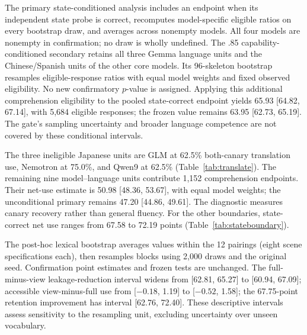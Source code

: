 The primary state-conditioned analysis includes an endpoint when its independent state probe is correct, recomputes model-specific eligible ratios on every bootstrap draw, and averages across nonempty models. All four models are nonempty in confirmation; no draw is wholly undefined. The .85 capability-conditioned secondary retains all three Gemma language units and the Chinese/Spanish units of the other core models. Its 96-skeleton bootstrap resamples eligible-response ratios with equal model weights and fixed observed eligibility. No new confirmatory $p$-value is assigned. Applying this additional comprehension eligibility to the pooled state-correct endpoint yields 65.93 [64.82, 67.14], with 5,684 eligible responses; the frozen value remains 63.95 [62.73, 65.19]. The gate's sampling uncertainty and broader language competence are not covered by these conditional intervals.

The three ineligible Japanese units are GLM at 62.5\% both-canary translation use, Nemotron at 75.0\%, and Qwen9 at 62.5\% (Table~\ref{tab:translate}). The remaining nine model--language units contribute 1,152 comprehension endpoints. Their net-use estimate is 50.98 [48.36, 53.67], with equal model weights; the unconditional primary remains 47.20 [44.86, 49.61]. The diagnostic measures canary recovery rather than general fluency. For the other boundaries, state-correct net use ranges from 67.58 to 72.19 points (Table~\ref{tab:stateboundary}).

The post-hoc lexical bootstrap averages values within the 12 pairings (eight scene specifications each), then resamples blocks using 2,000 draws and the original seed. Confirmation point estimates and frozen tests are unchanged. The full-minus-view leakage-reduction interval widens from [62.81, 65.27] to [60.94, 67.09]; accessible view-minus-full use from [$-0.18$, 1.19] to [$-0.52$, 1.58]; the 67.75-point retention improvement has interval [62.76, 72.40]. These descriptive intervals assess sensitivity to the resampling unit, excluding uncertainty over unseen vocabulary.

